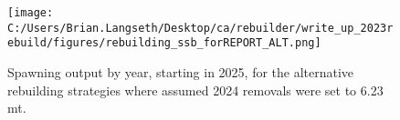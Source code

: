 \documentclass[11pt,
  letterpaper,
]{article}
\begin{document}
\begin{figure}
\centering
\texttt{[image: C:/Users/Brian.Langseth/Desktop/ca/rebuilder/write\_up\_2023rebuild/figures/rebuilding\_ssb\_forREPORT\_ALT.png]}
\caption{Spawning output by year, starting in 2025, for the alternative rebuilding strategies where assumed 2024 removals were set to 6.23 mt.\label{fig:ssb-fig-alt}}
\end{figure}

\clearpage
\end{document}
